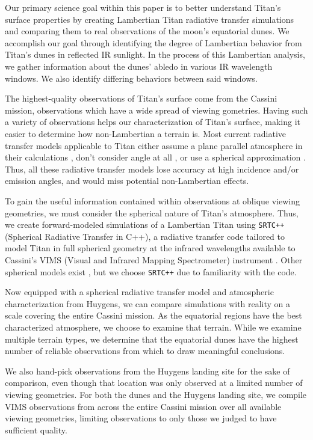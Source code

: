 \documentclass[twocolumn,linenumbers]{aastex631}
\def\srtcppspace{{\tt SRTC++} }
\begin{document}
Our primary science goal within this paper is to better understand Titan's surface properties by creating Lambertian Titan radiative transfer simulations and comparing them to real observations of the moon's equatorial dunes. We accomplish our goal through identifying the degree of Lambertian behavior from Titan's dunes in reflected IR sunlight. In the process of this Lambertian analysis, we gather information about the dunes' abledo in various IR wavelength windows. We also identify differing behaviors between said windows.

The highest-quality observations of Titan's surface come from the Cassini mission, observations which have a wide spread of viewing gometries. Having such a variety of observations helps our characterization of Titan's surface, making it easier to determine how non-Lambertian a terrain is. Most current radiative transfer models applicable to Titan either assume a plane parallel atmosphere in their calculations \citep{Griffith2012, Rodriguez2018, EsSayeh2023}, don't consider angle at all \citep{Vinatier2007, Rannou2021}, or use a spherical approximation \citep{Corlies2021}. Thus, all these radiative transfer models lose accuracy at high incidence and/or emission angles, and would miss potential non-Lambertian effects.

To gain the useful information contained within observations at oblique viewing geometries, we must consider the spherical nature of Titan's atmosphere. Thus, we create forward-modeled simulations of a Lambertian Titan using \srtcppspace (Spherical Radiative Transfer in C++), a radiative transfer code tailored to model Titan in full spherical geometry at the infrared wavelengths available to Cassini's VIMS (Visual and Infrared Mapping Spectrometer) instrument \citep{Barnes2018a}. Other spherical models exist \citep{Xu2013}, but we choose \srtcppspace due to familiarity with the code.

Now equipped with a spherical radiative transfer model and atmospheric characterization from Huygens, we can compare simulations with reality on a scale covering the entire Cassini mission. As the equatorial regions have the best characterized atmosphere, we choose to examine that terrain. While we examine multiple terrain types, we determine that the equatorial dunes have the highest number of reliable observations from which to draw meaningful conclusions.

We also hand-pick observations from the Huygens landing site for the sake of comparison, even though that location was only observed at a limited number of viewing geometries. For both the dunes and the Huygens landing site, we compile VIMS observations from across the entire Cassini mission over all available viewing geometries, limiting observations to only those we judged to have sufficient quality.
\end{document}
